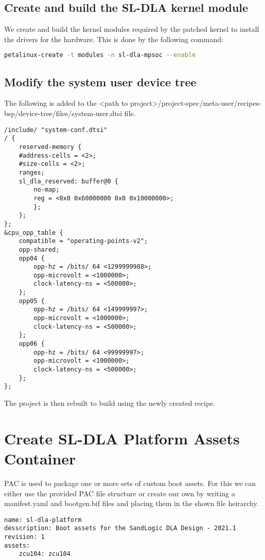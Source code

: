 \documentclass{article}
\begin{document}
\subsection{Create and build the SL-DLA kernel module}
We create and build the kernel modules required by the patched kernel to install the drivers for the hardware.
This is done by the following command:
\begin{lstlisting}[language=bash]
petalinux-create -t modules -n sl-dla-mpsoc --enable
\end{lstlisting}

\subsection{Modify the system user device tree}
The following is added to the <path to project>/project-spec/meta-user/recipes-bsp/device-tree/files/system-user.dtsi
file.
\begin{lstlisting}
/include/ "system-conf.dtsi"
/ {
    reserved-memory {
    #address-cells = <2>;
    #size-cells = <2>;
    ranges;
    sl_dla_reserved: buffer@0 {
        no-map;
        reg = <0x0 0x60000000 0x0 0x10000000>;
        };
    };
};
&cpu_opp_table {
    compatible = "operating-points-v2";
    opp-shared;
    opp04 {
        opp-hz = /bits/ 64 <1299999988>;
        opp-microvolt = <1000000>;
        clock-latency-ns = <500000>;
    };
    opp05 {
        opp-hz = /bits/ 64 <149999997>;
        opp-microvolt = <1000000>;
        clock-latency-ns = <500000>;
    };
    opp06 {
        opp-hz = /bits/ 64 <99999997>;
        opp-microvolt = <1000000>;
        clock-latency-ns = <500000>;
    };
};
\end{lstlisting}

The project is then rebuilt to build using the newly created recipe.

\section{Create SL-DLA Platform Assets Container}
PAC is used to package one or more sets of custom boot assets. For this we can either use the provided PAC file
structure or create our own by writing a manifest.yaml and bootgen.bif files and placing them in the shown file
heirarchy.

\begin{lstlisting}[caption=manifest.yaml]
name: sl-dla-platform
desscription: Boot assets for the SandLogic DLA Design - 2021.1
revision: 1
assets:
    zcu104: zcu104
\end{lstlisting}
\end{document}
